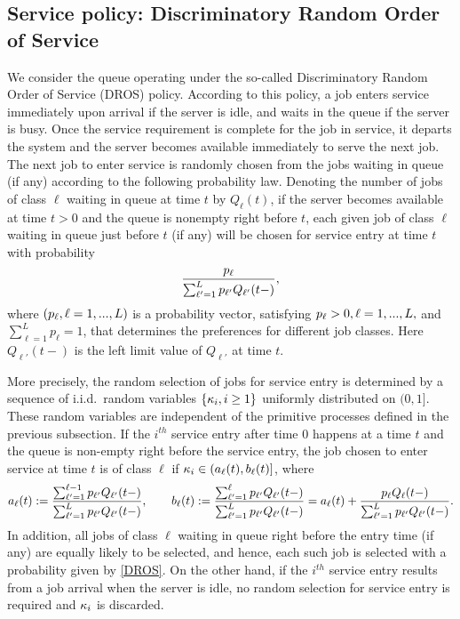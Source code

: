 \documentclass{article}
\numberwithin{equation}{section}
\begin{document}
\subsection{Service policy: Discriminatory Random Order of Service}
We consider the queue operating under the so-called Discriminatory Random Order of Service (DROS) policy. According to this policy, a job  enters service immediately upon arrival if the server is idle, and waits in the queue if the server is busy. Once the service requirement is complete for the job in service, it departs the system and the server becomes available immediately to serve the next job. The next job to enter service is randomly chosen from the jobs waiting in queue (if any) according to the following probability law. Denoting the number of jobs of class $\ell$ waiting in queue at time $t$ by $Q_\ell(t)$, if the server becomes available at time $t>0$ and the queue is nonempty right before $t$, each given job of class $\ell$ waiting in queue just before $t$ (if any) will be chosen for service entry at time $t$ with probability
\begin{equation}\label{DROS}
\frac{p_\ell}{\sum_{\ell'=1}^Lp_{\ell'}Q_{\ell'}(t-)},
\end{equation}
where $(p_\ell,\ell=1,...,L)$ is a probability vector, satisfying $p_\ell>0,\ell=1,...,L,$ and $\sum_{\ell=1}^Lp_{\ell}=1$, that determines the preferences for different job classes.
Here $Q_{\ell'}(t-)$ is the left limit value of $Q_{\ell'}$ at time $t$.

More precisely, the random selection of jobs for service entry is determined by a sequence of i.i.d.\ random variables $\{\kappa_i,i\geq1\}$ uniformly distributed on $(0,1]$.  These random variables are independent of the primitive processes defined in the previous subsection. If the $i^{th}$ service entry after time $0$ happens at a time $t$ and the queue is non-empty right before the service entry, the job chosen to enter service at time $t$ is of class $\ell$ if
$\kappa_i\in(a_\ell(t),b_\ell(t)]$, where
\begin{equation}\label{def_class_interval}
	a_\ell (t) := \frac{\sum_{\ell'=1}^{\ell-1}p_{\ell'}Q_{\ell'}(t-)}{\sum_{\ell'=1}^{L}p_{\ell'}Q_{\ell'}(t-)},\quad\quad 	b_\ell (t):= \frac{\sum_{\ell'=1}^{\ell}p_{\ell'}Q_{\ell'}(t-)}{\sum_{\ell'=1}^{L}p_{\ell'}Q_{\ell'}(t-)}= 	a_\ell (t)+ \frac{p_{\ell}Q_{\ell}(t-)}{\sum_{\ell'=1}^{L}p_{\ell'}Q_{\ell'}(t-)}.
\end{equation}
In addition, all jobs of class $\ell$ waiting in queue right before the entry time  (if any) are equally likely to be selected, and hence, each such job is selected with a probability given by \eqref{DROS}.  On the other hand, if the $i^{th}$ service entry results from a job arrival when the server is idle, no random selection for service entry is required and $\kappa_i$ is discarded.
\end{document}
